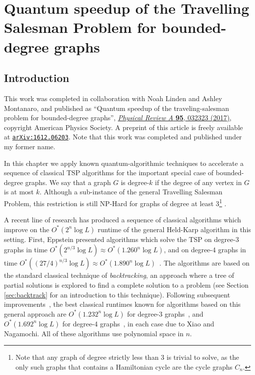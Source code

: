 \chapter{Quantum speedup of the Travelling Salesman Problem for bounded-degree graphs}
\label{chp:tsp}

\section{Introduction}

This work was completed in collaboration with Noah Linden and Ashley Montanaro, and published as ``Quantum speedup of the traveling-salesman problem for bounded-degree graphs'', \href{https://link.aps.org/doi/10.1103/PhysRevA.95.032323}{\textit{Physical Review A} \textbf{95}, 032323 (2017)}, copyright American Physics Society. A preprint of this article is freely available at {\tt \href{https://arxiv.org/abs/1612.06203}{arXiv:1612.06203}}. Note that this work was completed and published under my former name.

In this chapter we apply known quantum-algorithmic techniques to accelerate a sequence of classical TSP algorithms for the important special case of bounded-degree graphs. We say that a graph $G$ is degree-$k$ if the degree of any vertex in $G$ is at most $k$. Although a sub-instance of the general Travelling Salesman Problem, this restriction is still NP-Hard for graphs of degree at least 3\footnote{Note that any graph of degree strictly less than 3 is trivial to solve, as the only such graphs that contains a Hamiltonian cycle are the cycle graphs $C_n$.} \cite{akiyama1980}.

A recent line of research has produced a sequence of classical algorithms which improve on the $O^*(2^n\log L)$ runtime of the general Held-Karp algorithm in this setting. First, Eppstein presented algorithms which solve the TSP on degree-3 graphs in time $O^*(2^{n/3}\log L) \approx O^*(1.260^n\log L)$, and on degree-4 graphs in time $O^*((27/4)^{n/3}\log L) \approx O^*(1.890^n\log L)$~\cite{eppstein2007}. The algorithms are based on the standard classical technique of {\em backtracking}, an approach where a tree of partial solutions is explored to find a complete solution to a problem (see Section \ref{sec:backtrack} for an introduction to this technique). Following subsequent improvements~\cite{iwama2007,liskiewicz14}, the best classical runtimes known for algorithms based on this general approach are $O^*(1.232^n\log L)$ for degree-3 graphs~\cite{xiao2016degree3}, and $O^*(1.692^n\log L)$ for degree-4 graphs~\cite{xiao2016degree4}, in each case due to Xiao and Nagamochi. All of these algorithms use polynomial space in $n$.

